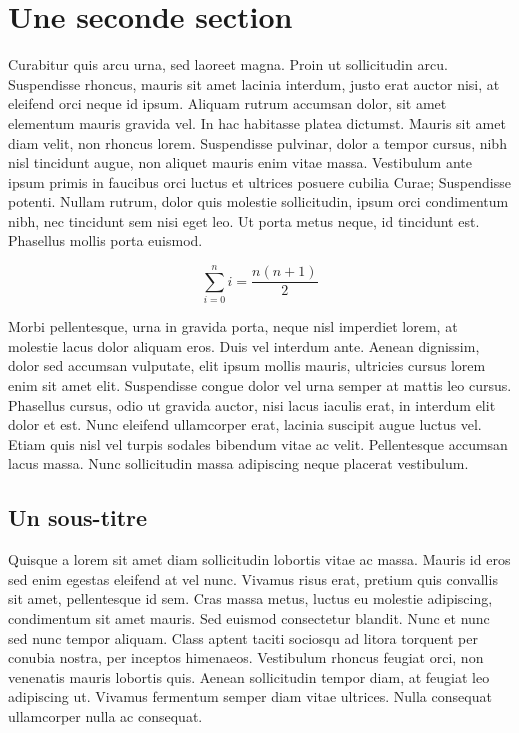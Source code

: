 \section{Une seconde section}

Curabitur quis arcu urna, sed laoreet magna. Proin ut sollicitudin arcu.
Suspendisse rhoncus, mauris sit amet lacinia interdum, justo erat auctor
nisi, at eleifend orci neque id ipsum. Aliquam rutrum accumsan dolor, sit
amet elementum mauris gravida vel. In hac habitasse platea dictumst. Mauris
sit amet diam velit, non rhoncus lorem. Suspendisse pulvinar, dolor a tempor
cursus, nibh nisl tincidunt augue, non aliquet mauris enim vitae massa.
Vestibulum ante ipsum primis in faucibus orci luctus et ultrices posuere
cubilia Curae; Suspendisse potenti. Nullam rutrum, dolor quis molestie
sollicitudin, ipsum orci condimentum nibh, nec tincidunt sem nisi eget leo.
Ut porta metus neque, id tincidunt est. Phasellus mollis porta euismod.

\[
  \sum_{i=0}^n i = \frac{n(n+1)}{2}
\]

Morbi pellentesque, urna in gravida porta, neque nisl imperdiet lorem, at
molestie lacus dolor aliquam eros. Duis vel interdum ante. Aenean dignissim,
dolor sed accumsan vulputate, elit ipsum mollis mauris, ultricies cursus
lorem enim sit amet elit. Suspendisse congue dolor vel urna semper at mattis
leo cursus. Phasellus cursus, odio ut gravida auctor, nisi lacus iaculis
erat, in interdum elit dolor et est. Nunc eleifend ullamcorper erat, lacinia
suscipit augue luctus vel. Etiam quis nisl vel turpis sodales bibendum vitae
ac velit. Pellentesque accumsan lacus massa. Nunc sollicitudin massa
adipiscing neque placerat vestibulum.

\subsection{Un sous-titre}

Quisque a lorem sit amet diam sollicitudin lobortis vitae ac massa. Mauris
id eros sed enim egestas eleifend at vel nunc. Vivamus risus erat, pretium
quis convallis sit amet, pellentesque id sem. Cras massa metus, luctus eu
molestie adipiscing, condimentum sit amet mauris. Sed euismod consectetur
blandit. Nunc et nunc sed nunc tempor aliquam. Class aptent taciti sociosqu
ad litora torquent per conubia nostra, per inceptos himenaeos. Vestibulum
rhoncus feugiat orci, non venenatis mauris lobortis quis. Aenean
sollicitudin tempor diam, at feugiat leo adipiscing ut. Vivamus fermentum
semper diam vitae ultrices. Nulla consequat ullamcorper nulla ac consequat.

